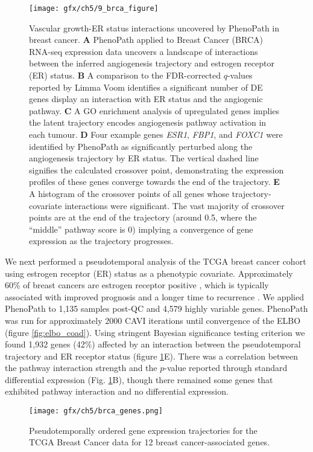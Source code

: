 \begin{figure}
\texttt{[image: gfx/ch5/9\_brca\_figure]}
\caption{Vascular growth-ER status interactions uncovered by PhenoPath in breast cancer.
\textbf{A} PhenoPath applied to Breast Cancer (BRCA) RNA-seq expression data uncovers a landscape of interactions between the inferred angiogenesis trajectory and estrogen receptor (ER) status.
\textbf{B} A comparison to the FDR-corrected $q$-values reported by Limma Voom identifies a significant number of DE genes display an interaction with ER status and the angiogenic pathway.
\textbf{C} A GO enrichment analysis of upregulated genes implies the latent trajectory encodes angiogenesis pathway activation in each tumour.
\textbf{D} Four example genes \emph{ESR1}, \emph{FBP1}, and \emph{FOXC1} were identified by PhenoPath as significantly perturbed along the angiogenesis trajectory by ER status. The vertical dashed line signifies the calculated crossover point, demonstrating the expression profiles of these genes converge towards the end of the trajectory.
\textbf{E} A histogram of the crossover points of all genes whose trajectory-covariate interactions were significant. The vast majority of crossover points are at the end of the trajectory (around 0.5, where the ``middle'' pathway score is 0) implying a convergence of gene expression as the trajectory progresses.
} \label{fig:brca}
\end{figure}


We next performed a pseudotemporal analysis of the TCGA breast cancer cohort using estrogen receptor (ER) status as a phenotypic covariate. Approximately 60\% of breast cancers are estrogen receptor positive
\cite{Early_Breast_Cancer_Trialists_Collaborative_Group_EBCTCG_undated-ux}, which is typically associated with improved prognosis and a longer time to recurrence 
\cite{Parl1984-fo}. We applied PhenoPath to 1,135 samples post-QC and 4,579 highly variable genes. PhenoPath was run for approximately 2000 CAVI iterations until convergence of the ELBO (figure \ref{fig:elbo_coad}). Using stringent Bayesian significance testing criterion we found 1,932 genes (42\%) affected by an interaction between the pseudotemporal trajectory and ER receptor status (figure \ref{fig:brca}E).
 There was a correlation between the pathway interaction strength and the $p$-value reported through standard differential expression (Fig. \ref{fig:brca}B), though there remained some genes that exhibited pathway interaction and no differential expression.

\begin{figure}
   \texttt{[image: gfx/ch5/brca\_genes.png]}
   \caption{Pseudotemporally ordered gene expression trajectories for the TCGA Breast Cancer data for 12 breast cancer-associated genes.}
	\label{fig:brca_genes}
\end{figure}

